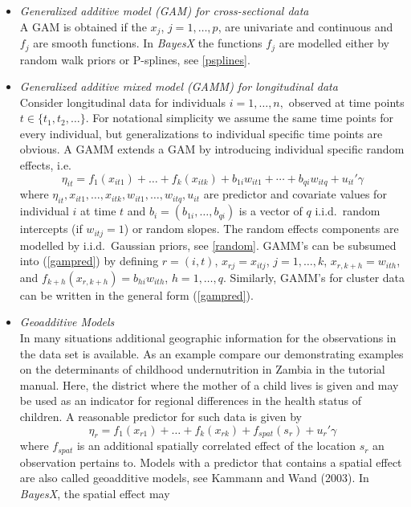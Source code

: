 \documentclass[11pt,a4paper,twoside]{bayesxarticle}
\begin{document}
\begin{itemize}
\item {\em Generalized additive model (GAM) for cross-sectional data} \\
A GAM is obtained if  the $x_j$, $j=1,\dots,p$, are univariate and
continuous and $f_j$ are smooth functions. In {\em BayesX} the
functions $f_j$ are modelled either by random walk priors or
P-splines, see \autoref{psplines}.
\item {\em Generalized additive mixed model (GAMM) for longitudinal data} \\
Consider longitudinal data for individuals $i=1,\dots,n,$ observed
at time points $t \in \{ t_1,t_2,\dots \}$. For notational
simplicity we assume the same time points for every individual,
but generalizations to individual specific time points are
obvious. A GAMM extends a GAM by introducing individual specific
random effects, i.e.
$$
\eta_{it} = f_1(x_{it1})+\dots+f_k(x_{itk}) + b_{1i} w_{it1}  +
\cdots + b_{qi} w_{itq}  + u_{it}'\gamma
$$
where
$\eta_{it},x_{it1},\dots,x_{itk},w_{it1},\dots,w_{itq},u_{it}$ are
predictor and covariate values for individual $i$ at time $t$ and
$b_i=(b_{1i},\dots,b_{qi})$ is a vector of $q$ i.i.d.~random
intercepts (if $w_{itj} = 1$) or random slopes. The random effects
components are modelled by i.i.d.~Gaussian priors, see
\autoref{random}. GAMM's can be subsumed into (\ref{gampred}) by
defining $r=(i,t)$, $x_{rj} = x_{itj}$, $j=1,\dots,k$, $x_{r,k+h}
= w_{ith}$, and $f_{k+h}(x_{r,k+h}) = b_{hi} w_{ith}$,
$h=1,\dots,q$. Similarly, GAMM's for cluster data can be written
in the general form (\ref{gampred}).
\item {\em Geoadditive Models} \\
In many situations additional geographic information for the
observations in the data set is available. As an example compare our
demonstrating examples on the determinants of childhood
undernutrition in Zambia in the tutorial manual. Here, the district
where the mother of a child lives is given and may be used as an
indicator for regional differences in the health status of children.
A reasonable predictor for such data is given by
\begin{equation}
\eta_{r} = f_1(x_{r1})+\dots+f_k(x_{rk}) + f_{spat}(s_{r}) + u_r'
\gamma
\end{equation}
where $f_{spat}$ is an additional spatially correlated effect of the
location $s_{r}$ an observation pertains to. Models with a predictor
that contains a spatial effect are also called geoadditive models,
see Kammann and Wand (2003). In {\em BayesX}, the spatial effect may

\end{itemize}
\end{document}
